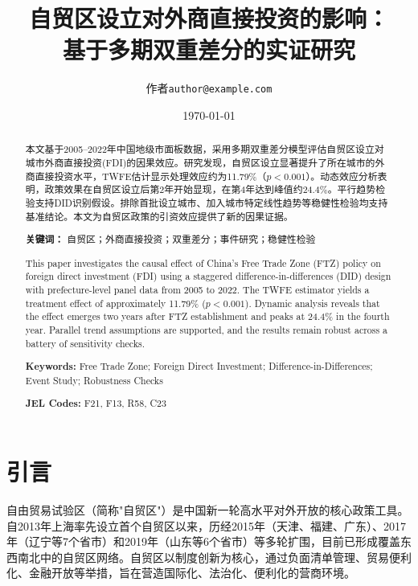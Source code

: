 \documentclass[12pt,a4paper]{article}
\title{\textbf{自贸区设立对外商直接投资的影响：\\基于多期双重差分的实证研究}}
\author{作者\quad\texttt{author@example.com}}
\date{\today}
\begin{document}
\maketitle
\thispagestyle{empty}

\begin{abstract}
\noindent 本文基于2005--2022年中国地级市面板数据，采用多期双重差分模型评估自贸区设立对城市外商直接投资(FDI)的因果效应。研究发现，自贸区设立显著提升了所在城市的外商直接投资水平，TWFE估计显示处理效应约为11.79\%（$p<0.001$）。动态效应分析表明，政策效果在自贸区设立后第2年开始显现，在第4年达到峰值约24.4\%。平行趋势检验支持DID识别假设。排除首批设立城市、加入城市特定线性趋势等稳健性检验均支持基准结论。本文为自贸区政策的引资效应提供了新的因果证据。

\vspace{0.5cm}
\noindent \textbf{关键词：} 自贸区；外商直接投资；双重差分；事件研究；稳健性检验
\end{abstract}

\begin{abstract}
\noindent This paper investigates the causal effect of China's Free Trade Zone (FTZ) policy on foreign direct investment (FDI) using a staggered difference-in-differences (DID) design with prefecture-level panel data from 2005 to 2022. The TWFE estimator yields a treatment effect of approximately 11.79\% ($p<0.001$). Dynamic analysis reveals that the effect emerges two years after FTZ establishment and peaks at 24.4\% in the fourth year. Parallel trend assumptions are supported, and the results remain robust across a battery of sensitivity checks.

\vspace{0.5cm}
\noindent \textbf{Keywords:} Free Trade Zone; Foreign Direct Investment; Difference-in-Differences; Event Study; Robustness Checks

\vspace{0.3cm}
\noindent \textbf{JEL Codes:} F21, F13, R58, C23
\end{abstract}

\newpage
\setcounter{page}{1}

\section{引言}
\label{sec:intro}

自由贸易试验区（简称"自贸区"）是中国新一轮高水平对外开放的核心政策工具。自2013年上海率先设立首个自贸区以来，历经2015年（天津、福建、广东）、2017年（辽宁等7个省市）和2019年（山东等6个省市）等多轮扩围，目前已形成覆盖东西南北中的自贸区网络。自贸区以制度创新为核心，通过负面清单管理、贸易便利化、金融开放等举措，旨在营造国际化、法治化、便利化的营商环境。
\end{document}
